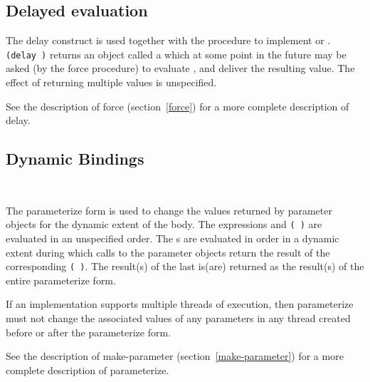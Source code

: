 \subsection{Delayed evaluation}\unsection

\begin{entry}{%
}


The {\cf delay} construct is used together with the procedure  to
implement  or .
{\tt(delay~)} returns an object called a
 which at some point in the future may be asked (by
the {\cf force} procedure)  to evaluate
, and deliver the resulting value.
The effect of  returning multiple values
is unspecified.

See the description of {\cf force} (section~\ref{force}) for a
more complete description of {\cf delay}.

\end{entry}

\subsection{Dynamic Bindings}\unsection

\begin{entry}{%
{\tt\obeyspaces%
\hspace*{1em}}}

The {\cf parameterize} form is used to change the values returned by
parameter objects for the dynamic extent of the body.
The expressions  and \texttt{( )}
are evaluated in an unspecified order.  The s are
evaluated in order in a dynamic extent during which calls to the
 parameter objects return the result of the corresponding
\texttt{( )}.  The result(s) of the last
 is(are) returned as the result(s) of the entire {\cf
  parameterize} form.

If an implementation supports multiple threads of execution, then {\cf
  parameterize} must not change the associated values of any
parameters in any thread created before or after the {\cf
  parameterize} form.

See the description of {\cf make-parameter}
(section~\ref{make-parameter}) for a more complete description of {\cf
  parameterize}.
\end{entry}


